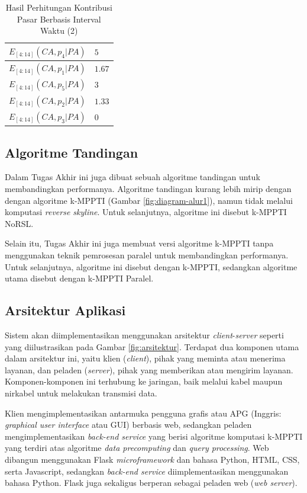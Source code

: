 \begin{table}[H]
	\small
	\centering
	\begin{tabular}{|p{3cm}|p{2cm}|}
		\hline
		$E_{[4:14]}(CA, p_4|PA)$ & $5$ \\ \hline
		$E_{[4:14]}(CA, p_1|PA)$ & $1.67$ \\ \hline
		$E_{[4:14]}(CA, p_5|PA)$ & $3$ \\ \hline
		$E_{[4:14]}(CA, p_2|PA)$ & $1.33$ \\ \hline
		$E_{[4:14]}(CA, p_3|PA)$ & $0$ \\ \hline
	\end{tabular} 
	\caption{Hasil Perhitungan Kontribusi Pasar Berbasis Interval Waktu (2)}
	\label{tab:mc-ti-res2}
\end{table}

\subsection{Algoritme Tandingan}
\tab Dalam Tugas Akhir ini juga dibuat sebuah algoritme tandingan untuk membandingkan performanya. Algoritme tandingan kurang lebih mirip dengan dengan algoritme k-MPPTI (Gambar \ref{fig:diagram-alur1}), namun tidak melalui komputasi \textit{reverse skyline}. Untuk selanjutnya, algoritme ini disebut k-MPPTI NoRSL.

Selain itu, Tugas Akhir ini juga membuat versi algoritme k-MPPTI tanpa menggunakan teknik pemrosesan paralel untuk membandingkan performanya. Untuk selanjutnya, algoritme ini disebut dengan k-MPPTI, sedangkan algoritme utama disebut dengan k-MPPTI Paralel.

\subsection{Arsitektur Aplikasi} 
\tab Sistem akan diimplementasikan menggunakan arsitektur \textit{client}-\textit{server} seperti yang diilustrasikan pada Gambar \ref{fig:arsitektur}. Terdapat dua komponen utama dalam arsitektur ini, yaitu klien (\textit{client}), pihak yang meminta atau menerima layanan, dan peladen (\textit{server}), pihak yang memberikan atau mengirim layanan. Komponen-komponen ini terhubung ke jaringan, baik melalui kabel maupun nirkabel untuk melakukan transmisi data. 

Klien mengimplementasikan antarmuka pengguna grafis atau APG (Inggris: \textit{graphical user interface} atau GUI) berbasis web, sedangkan peladen mengimplementasikan \textit{back-end service} yang berisi algoritme komputasi k-MPPTI yang terdiri atas algoritme \textit{data precomputing} dan \textit{query processing}. Web dibangun menggunakan Flask \textit{microframework} dan bahasa Python, HTML, CSS, serta Javascript, sedangkan \textit{back-end service} diimplementasikan menggunakan bahasa Python. Flask juga sekaligus berperan sebagai peladen web (\textit{web server}).


